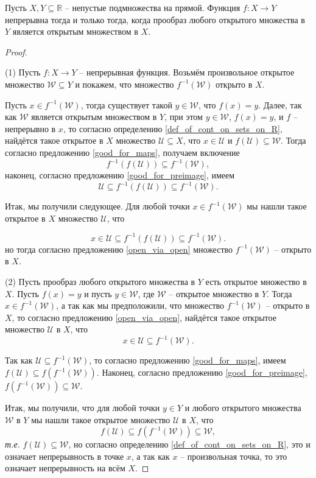 \begin{theorem}\label{preimage_of_open}
Пусть $X,Y \subseteq \mathbb{R}$ -- непустые подмножества на прямой. Функция $f:X \to Y$ непрерывна тогда и только тогда, когда прообраз любого открытого множества в $Y$ является открытым множеством в $X.$
\end{theorem}
\begin{proof}~

(1) Пусть $f:X \to Y$ -- непрерывная функция. Возьмём произвольное открытое множество $\mathscr{W} \subseteq Y$ и покажем, что множество $f^{-1}(\mathscr{W})$ открыто в $X$.

Пусть $x \in f^{-1}(\mathscr{W})$, тогда существует такой $y \in \mathscr{W}$, что $f(x) = y$. Далее, так как $\mathscr{W}$ является открытым множеством в $Y$, при этом $y\in \mathscr{W}$, $f(x) = y$, и $f$ -- непрерывно в $x$, то согласно определению \ref{def_of_cont_on_sets_on_R}, найдётся такое открытое в $X$ множество $\mathscr{U} \subseteq X$, что $x \in \mathscr{U}$ и $f(\mathscr{U}) \subseteq \mathscr{W}.$ Тогда согласно предложению \ref{good_for_maps}, получаем включение
\[
 f^{-1}(f(\mathscr{U})) \subseteq f^{-1}(\mathscr{W}),
\]
наконец, согласно предложению \ref{good_for_preimage}, имеем
\[
 \mathscr{U} \subseteq f^{-1}(f(\mathscr{U})) \subseteq f^{-1}(\mathscr{W}).
\]

Итак, мы получили следующее. Для любой точки $x \in f^{-1}(\mathscr{W})$ мы нашли такое открытое в $X$ множество $\mathscr{U}$, что

\[
 x \in \mathscr{U} \subseteq f^{-1}(f(\mathscr{U})) \subseteq f^{-1}(\mathscr{W}).
\]
но тогда согласно предложению \ref{open_via_open} множество $f^{-1}(\mathscr{W})$ -- открыто в $X.$


(2) Пусть прообраз любого открытого множества в $Y$ есть открытое множество в $X$. Пусть $f(x) = y$ и пусть $y \in \mathscr{W}$, где $\mathscr{W}$ -- открытое множество в $Y$. Тогда $x \in f^{-1}(\mathscr{W})$, а так как мы предположили, что множество $f^{-1}(\mathscr{W})$ -- открыто в $X$, то согласно предложению \ref{open_via_open}, найдётся такое открытое множество $\mathscr{U}$ в $X$, что
\[
 x \in \mathscr{U} \subseteq f^{-1}(\mathscr{W}).
\]

Так как $\mathscr{U} \subseteq f^{-1}(\mathscr{W})$, то согласно предложению \ref{good_for_maps}, имеем $f(\mathscr{U}) \subseteq f(f^{-1}(\mathscr{W}))$. Наконец, согласно предложению \ref{good_for_preimage}, $f(f^{-1}(\mathscr{W})) \subseteq \mathscr{W}$.

Итак, мы получили, что для любой точки $y\in Y$ и любого открытого множества $\mathscr{W}$ в $Y$ мы нашли такое открытое множество $\mathscr{U}$ в $X$, что 
\[
f(\mathscr{U}) \subseteq f(f^{-1}(\mathscr{W})) \subseteq \mathscr{W},
\]
\textit{т.е.} $f(\mathscr{U}) \subseteq \mathscr{W}$, но согласно определению \ref{def_of_cont_on_sets_on_R}, это и означает непрерывность в точке $x$, а так как $x$ -- произвольная точка, то это означает непрерывность на всём $X$.
\end{proof}

